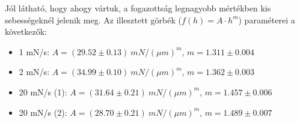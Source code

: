\documentclass[a4paper,12pt]{article}
\begin{document}
\par Jól látható, hogy ahogy vártuk, a fogazottság legnagyobb mértékben kis sebességeknél jelenik meg. Az illesztett görbék ($f(h) = A\cdot h^{m}$) paraméterei a következők:

\begin{itemize}
\item 1 mN/s: $A = (29.52\pm0.13)~mN/(\mu m)^m$, $m = 1.311\pm0.004$
\item 2 mN/s: $A = (34.99\pm0.10)~mN/(\mu m)^m$, $m = 1.362\pm0.003$
\item 20 mN/s (1): $A = (31.64\pm0.21)~mN/(\mu m)^m$, $m = 1.457\pm0.006$
\item 20 mN/s (2): $A = (28.70\pm0.21)~mN/(\mu m)^m$, $m = 1.489\pm0.007$
\end{itemize}
\end{document}
